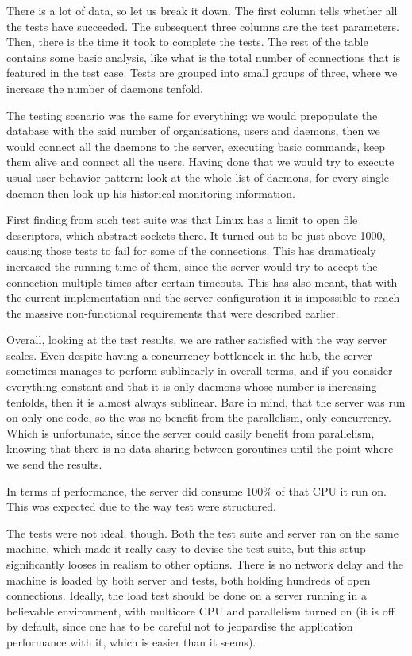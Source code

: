 \documentclass{l3proj}
\begin{document}
There is a  lot of data, so let us break it down. The first column tells whether all the tests have succeeded. The subsequent three columns are the test parameters. Then, there is the time it took to complete the tests. The rest of the table contains some basic analysis, like what is the total number of connections that is featured in the test case. Tests are grouped into small groups of three, where we increase the number of daemons tenfold. 

The testing scenario was the same for everything: we would prepopulate the database with the said number of organisations, users and daemons, then we would connect all the daemons to the server, executing basic commands, keep them alive and connect all the users. Having done that we would try to execute usual user behavior pattern: look at the whole list of daemons, for every single daemon then look up his historical monitoring information.

First finding from such test suite was that Linux has a limit to open file descriptors, which abstract sockets there. It turned out to be just above 1000, causing those tests to fail for some of the connections. This has dramaticaly increased the running time of them, since the server would try to accept the connection multiple times after certain timeouts. This has also meant, that with the current implementation and the server configuration it is impossible to reach the massive non-functional requirements that were described earlier.

Overall, looking at the test results, we are rather satisfied with the way server scales. Even despite having a concurrency bottleneck in the hub, the server sometimes manages to perform sublinearly in overall terms, and if you consider everything constant and that it is only daemons whose number is increasing tenfolds, then it is almost always sublinear. Bare in mind, that the server was run on only one code, so the was no benefit from the parallelism, only concurrency. Which is unfortunate, since the server could easily benefit from parallelism, knowing that there is no data sharing between goroutines until the point where we send the results.

In terms of performance, the server did consume 100\% of that CPU it run on. This was expected due to the way test were structured.

The tests were not ideal, though. Both the test suite and server ran on the same machine, which made it really easy to devise the test suite, but this setup significantly looses in realism to other options. There is no network delay and the machine is loaded by both server and tests, both holding hundreds of open connections. Ideally, the load test should be done on a server running in a believable environment, with multicore CPU and parallelism turned on (it is off by default, since one has to be careful not to jeopardise the application performance with it, which is easier than it seems).
\end{document}
